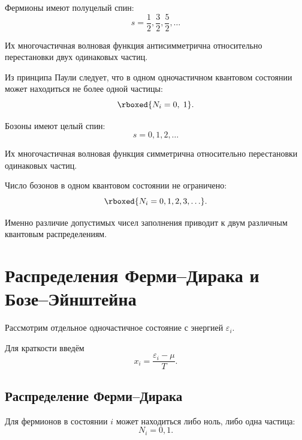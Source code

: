 \documentclass[../final.tex]{subfiles}
\begin{document}
Фермионы имеют полуцелый спин:
%
\begin{equation*}
    s
    =
    \frac{1}{2},
    \frac{3}{2},
    \frac{5}{2},
    \ldots
\end{equation*}

Их многочастичная волновая функция антисимметрична относительно
перестановки двух одинаковых частиц.

Из принципа Паули следует, что в одном одночастичном квантовом
состоянии может находиться не более одной частицы:
%
\[
    \rboxed{
        N_i
        =
        0,\;1
    }.
\]

Бозоны имеют целый спин:
%
\begin{equation*}
    s
    =
    0,1,2,\ldots
\end{equation*}

Их многочастичная волновая функция симметрична относительно
перестановки одинаковых частиц.

Число бозонов в одном квантовом состоянии не ограничено:
%
\[
    \rboxed{
        N_i
        =
        0,1,2,3,\ldots
    }.
\]

Именно различие допустимых чисел заполнения приводит к двум
различным квантовым распределениям.


\section{Распределения Ферми--Дирака и Бозе--Эйнштейна}

Рассмотрим отдельное одночастичное состояние с энергией
$\varepsilon_i$.

Для краткости введём
%
\begin{equation*}
    x_i
    =
    \frac{\varepsilon_i-\mu}{T}.
\end{equation*}


\subsection{Распределение Ферми--Дирака}

Для фермионов в состоянии $i$ может находиться либо ноль,
либо одна частица:
%
\begin{equation*}
    N_i
    =
    0,1.
\end{equation*}
\end{document}
